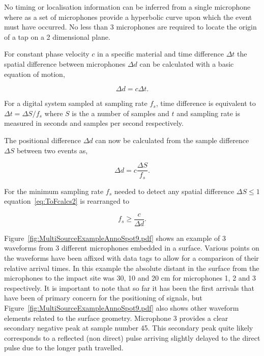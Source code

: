 No timing or localisation information can be inferred from a single microphone where as a set of microphones provide a hyperbolic curve upon which the event must have occurred. No less than 3 microphones are required to locate the origin of a tap on a 2 dimensional plane\cite{US7411581}. %

For constant phase velocity $c$ in a specific material and time difference $\Delta t$ the spatial difference between microphones $\Delta d$ can be calculated with a basic equation of motion,

\begin{equation}\label{eq:ToFcalcs1}
\Delta d  = c \Delta t.
\end{equation}

For a digital system sampled at sampling rate $f_s$, time difference is equivalent to $\Delta t = \Delta S/f_s$ where $S$ is the a number of samples and $t$ and sampling rate is measured in seconds and samples per second respectively.

The positional difference $\Delta d$ can now be calculated from the sample difference $\Delta S$ between two events as,

\begin{equation}\label{eq:ToFcalcs2}
\Delta d  = c \frac{\Delta S}{f_s}.
\end{equation}

For the minimum sampling rate $f_s$ needed to detect any spatial difference $\Delta S \leq 1$ equation~\ref{eq:ToFcalcs2} is rearranged to

\begin{equation}\label{eq:ToFcalcs3}
f_s  \geq \frac{c}{\Delta d}.
\end{equation}

Figure~\ref{fig:MultiSourceExampleAnnoSpot9.pdf} shows an example of 3 waveforms from 3 different microphones embedded in a surface. Various points on the waveforms have been affixed with data tags to allow for a comparison of their relative arrival times. In this example the absolute distant in the surface from the microphones to the impact site was 30, 10 and 20 cm for microphones 1, 2 and 3 respectively. It is important to note that so far it has been the first arrivals that have been of primary concern for the positioning of signals, but Figure~\ref{fig:MultiSourceExampleAnnoSpot9.pdf} also shows other waveform elements related to the surface geometry. Microphone 3 provides a clear secondary negative peak at sample number 45. This secondary peak quite likely corresponds to a reflected (non direct) pulse arriving slightly delayed to the direct pulse due to the longer path travelled.

